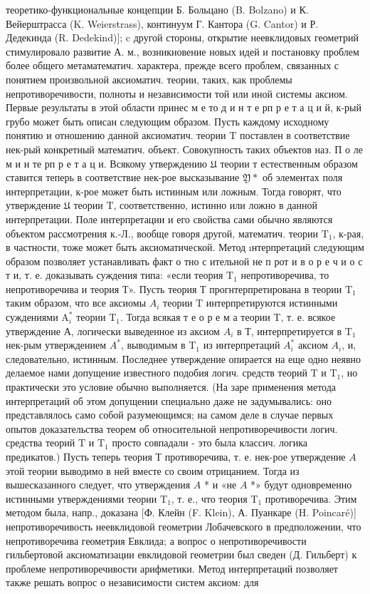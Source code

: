 \documentclass[10pt]{article}
\begin{document}
теоретико-функциональные концепции Б. Больцано (B. Bolzano) и К. Вейерштрасса (K. Weierstrass), континуум Г. Кантора (G. Cantor) и Р. Дедекинда (R. Dedekind)]; c другой стороны, открытие неевклидовых геометрий стимулировало развитие А. м., возникновение новых идей и постановку проблем более общего метаматематич. характера, прежде всего проблем, связанных с понятием произвольной аксиоматич. теории, таких, как проблемы непротиворечивости, полноты и независимости той или иной системы аксиом. Первые результаты в этой области принес м е то д и н т е рп р е т а ц и й, к-рый грубо может быть описан следующим образом. Пусть каждому исходному понятию и отношению данной аксиоматич. теории $\mathrm{T}$ поставлен в соответствие нек-рый конкретный математич. объект. Совокупность таких объектов наз. П о ле м и н те рп р е т а ц и. Всякому утверждению $\mathfrak{U}$ теории т естественным образом ставится теперь в соответствие нек-рое высказывание $\mathfrak{Y} *$ об элементах поля интерпретации, к-рое может быть истинным или ложным. Тогда говорят, что утверждение $\mathfrak{U}$ теории $\mathrm{T}$, соответственно, истинно или ложно в данной интерпретации. Поле интерпретации и его свойства сами обычно являются объектом рассмотрения к.-Л., вообще говоря другой, математич. теории $\mathrm{T}_{1}$, к-рая, в частности, тоже может быть аксиоматической. Метод ıнтерпретаций следующим образом позволяет устанавливать факт о тно с ительной не п рот и в о р е ч и о с т и, т. е. доказывать суждения типа: «если теория $\mathrm{T}_{1}$ непротиворечива, то непротиворечива и теория Т». Пусть теория Т прогнтерпретирована в теории $\mathrm{T}_{1}$ таким образом, что все аксиомы $A_{i}$ теории $\mathrm{T}$ интерпретируются истинными суждениями $\mathrm{A}_{i}^{*}$ теории $\mathrm{T}_{1}$. Тогда всякая т е о р е м а теории T, т. е. всякое утверждение А, логически выведенное из аксиом $A_{i}$ в Т, интерпретируется в $\mathrm{T}_{1}$ нек-рым утверждением $A^{*}$, выводимым в $\mathrm{T}_{1}$ из интерпретаций $A_{i}^{*}$ аксиом $A_{i}$, и, следовательно, истинным. Последнее утверждение опирается на еще одно неявно делаемое нами допущение известного подобия логич. средств теорий $\mathrm{T}$ и $\mathrm{T}_{1}$, но практически это условие обычно выполняется. (На заре применения метода интерпретаций об этом допущении специально даже не задумывались: оно представлялось само собой разумеющимся; на самом деле в случае первых опытов доказательства теорем об относительной непротиворечивости логич. средства теорий $\mathrm{T}$ и $\mathrm{T}_{1}$ просто совпадали - это была классич. логика предикатов.) Пусть теперь теория Т противоречива, т. е. нек-рое утверждение $A$ этой теории выводимо в ней вместе со своим отрицанием. Тогда из вышесказанного следует, что утверждения $A$ * и «не $A$ *» будут одновременно истинными утверждениями теории $\mathrm{T}_{1}$, т. е., что теория $\mathrm{T}_{1}$ противоречива. Этим методом была, напр., доказана [Ф. Клейн (F. Klein), А. Пуанкаре (H. Poincaré)] непротиворечивость неевклидовой геометрии Лобачевского в предположении, что непротиворечива геометрия Евклида; а вопрос о непротиворечивости гильбертовой аксиоматизации евклидовой геометрии был сведен (Д. Гильберт) к проблеме непротиворечивости арифметики. Метод интерпретаций позволяет также решать вопрос о независимости систем аксиом: для 
\end{document}
